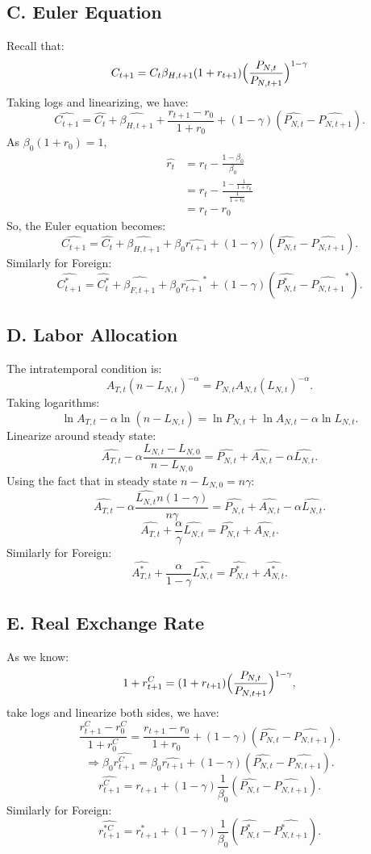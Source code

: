 \documentclass[a4paper,12pt]{article} %
\theoremstyle{nonitalic}
\begin{document}
\subsection*{C. Euler Equation}
Recall that:
\[
C_{t+1} = C_t \beta_{H, t+1}(1+r_{t+1})\Bigl(\frac{P_{N,t}}{P_{N,t+1}}\Bigr)^{1-\gamma}
\]
Taking logs and linearizing, we have:
\[
\widehat{C_{t+1}} = \widehat{C_t} + \widehat{\beta_{H,t+1}} + \frac{r_{t+1}-r_0}{1+r_0} + (1-\gamma)( \widehat{P_{N,t}}- \widehat{P_{N,t+1}}).
\]
As $\beta_0(1+r_0) = 1$,
\begin{align*}
    \widehat{r_t} &= r_t - \frac{1-\beta_0}{\beta_0} \\
    &= r_t - \frac{1-\frac{1}{1+r_0}}{\frac{1}{1+r_0}} \\
    &= r_t - r_0
\end{align*}
So, the Euler equation becomes:
\[
\widehat{C_{t+1}} = \widehat{C_t} + \widehat{\beta_{H,t+1}} + \beta_0  \widehat{r_{t+1}} + (1-\gamma)( \widehat{P_{N,t}}- \widehat{P_{N,t+1}}). \tag{7e}
\]
Similarly for Foreign:
\[
\widehat{C_{t+1}^*} = \widehat{C_t^*} + \widehat{\beta_{F,t+1}} + \beta_0  \widehat{r_{t+1}}^* + (1-\gamma)( \widehat{P_{N,t}^*}- \widehat{P_{N,t+1}}^*). \tag{7f}
\]

\subsection*{D. Labor Allocation}
The intratemporal condition is:
\[
A_{T,t}(n-L_{N,t})^{-\alpha} = P_{N,t} A_{N,t}(L_{N,t})^{-\alpha}.
\]
Taking logarithms:
\[
\ln A_{T,t} - \alpha \ln (n-L_{N,t}) = \ln P_{N,t} + \ln A_{N,t} - \alpha \ln L_{N,t}.
\]
Linearize around steady state:
\[
\widehat{A_{T,t}} - \alpha \frac{L_{N,t} - L_{N,0}}{n-L_{N,0}} =  \widehat{P_{N,t}} +  \widehat{A_{N,t}} - \alpha  \widehat{L_{N,t}}.
\]
Using the fact that in steady state $n-L_{N,0}=n\gamma$:
\[
\widehat{A_{T,t}} - \alpha \frac{ \widehat{L_{N,t}} n(1-\gamma)}{n \gamma} =  \widehat{P_{N,t}} +  \widehat{A_{N,t}} - \alpha  \widehat{L_{N,t}}.
\]
\[
\widehat{A_{T,t}} + \frac{\alpha}{\gamma}  \widehat{L_{N,t}} =  \widehat{P_{N,t}} +  \widehat{A_{N,t}}. \tag{7g}
\]
Similarly for Foreign:
\[
\widehat{A_{T,t}^*} + \frac{\alpha}{1-\gamma}  \widehat{L_{N,t}^*} =  \widehat{P_{N,t}^*} +  \widehat{A_{N,t}^*}. \tag{7h}
\]

\subsection*{E. Real Exchange Rate}
As we know:
\[
1+r_{t+1}^{C} = (1+r_{t+1}) \Bigl(\frac{P_{N,t}}{P_{N,t+1}}\Bigr)^{1-\gamma},
\]
take logs and linearize both sides, we have:
\[
\frac{r_{t+1}^C - r_0^C }{1+r_0^C} = \frac{r_{t+1} - r_0}{1+r_0} + (1-\gamma)( \widehat{P_{N,t}} -  \widehat{P_{N,t+1}}).
\]
\[
\Rightarrow \beta_0  \widehat{r_{t+1}^C} = \beta_0  \widehat{r_{t+1}} + (1-\gamma)( \widehat{P_{N,t}} -  \widehat{P_{N,t+1}}).
\]
\[
\widehat{r_{t+1}^C} =  \widehat{r_{t+1}} + (1-\gamma) \frac{1}{\beta_0} ( \widehat{P_{N,t}} -  \widehat{P_{N,t+1}}). \tag{7i}
\]
Similarly for Foreign:
\[
\widehat{r_{t+1}^{*C}} =  \widehat{r_{t+1}^*} + (1-\gamma) \frac{1}{\beta_0} ( \widehat{P_{N,t}^*} -  \widehat{P_{N,t+1}^*}). \tag{7j}
\]
\end{document}

